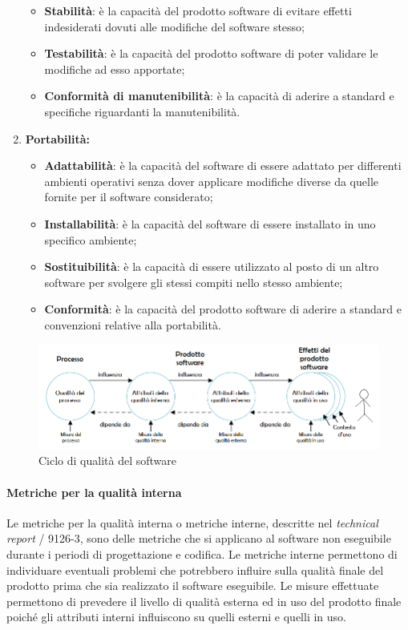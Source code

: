 \begin{enumerate}
\begin{itemize}
      \item \textbf{Stabilità}: è la capacità del prodotto software di evitare effetti indesiderati dovuti alle modifiche del software stesso;
      \item \textbf{Testabilità}: è la capacità del prodotto software di poter validare le modifiche ad esso apportate;
      \item \textbf{Conformità di manutenibilità}: è la capacità di aderire a standard e specifiche riguardanti la manutenibilità.
    \end{itemize}
    \item \textbf{Portabilità:}
    \begin{itemize}
      \item \textbf{Adattabilità}: è la capacità del software di essere adattato per differenti ambienti operativi senza dover applicare modifiche diverse da quelle fornite per il software considerato;
      \item \textbf{Installabilità}: è la capacità del software di essere installato in uno specifico ambiente;
      \item \textbf{Sostituibilità}: è la capacità di essere utilizzato al posto di un altro software per svolgere gli stessi compiti nello stesso ambiente;
      \item \textbf{Conformità}: è la capacità del prodotto software di aderire a standard e convenzioni relative alla portabilità.
    \end{itemize}
  \end{enumerate}

  \begin{figure}[h]
    \includegraphics[width=1\textwidth]{res/sections/img/qdps.png}
    \caption{Ciclo di qualità del software}
    \centering
    \label{}
  \end{figure}

  \paragraph{Metriche per la qualità interna}
    Le metriche per la qualità interna o metriche interne, descritte nel \emph{technical report} / 9126-3,
    sono delle metriche che si applicano al software non eseguibile durante i periodi di progettazione e codifica.
    Le metriche interne permettono di individuare eventuali problemi che potrebbero influire sulla qualità finale del prodotto prima che sia realizzato il software eseguibile.
    Le misure effettuate permettono di prevedere il livello di qualità esterna ed in uso del prodotto finale
    poiché gli attributi interni influiscono su quelli esterni e quelli in uso.\\


